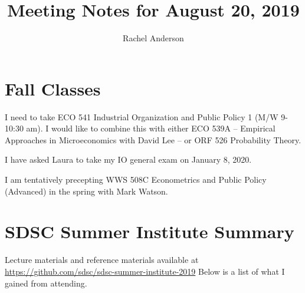 \documentclass[12pt]{article}
\title{Meeting Notes for August 20, 2019}
\author{Rachel Anderson}
\date{}
\begin{document}
\maketitle

\section{Fall Classes}
I need to take ECO 541 Industrial Organization and Public Policy 1 (M/W 9-10:30 am).  I would like to combine this with either ECO 539A -- Empirical Approaches in Microeconomics with David Lee -- or ORF 526 Probability Theory.    

I have asked Laura to take my IO general exam on January 8, 2020.   

I am tentatively precepting WWS 508C Econometrics and Public Policy (Advanced) in the spring with Mark Watson. 

\begin{figure}[h!]
    \centering
    \label{fig:my_label}
\end{figure}
\section{SDSC Summer Institute Summary}
Lecture materials and reference materials available at \url{https://github.com/sdsc/sdsc-summer-institute-2019} Below is a list of what I gained from attending. 
\end{document}
